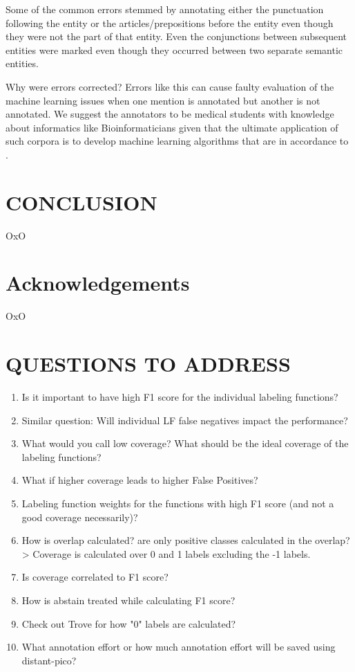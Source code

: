 \documentclass[10.7pt,]{article}
\begin{document}
Some of the common errors stemmed by annotating either the punctuation following the entity or the articles/prepositions before the entity even though they were not the part of that entity.
Even the conjunctions between subsequent entities were marked even though they occurred between two separate semantic entities.


Why were errors corrected?
Errors like this can cause faulty evaluation of the machine learning issues when one mention is annotated but another is not annotated.
We suggest the annotators to be medical students with knowledge about informatics like Bioinformaticians given that the ultimate application of such corpora is to develop machine learning algorithms that are in accordance to .
%
%
%
\section{CONCLUSION}\label{conclusion}
%
OxO
%
%
%
\section{Acknowledgements}\label{acknowledgements}
%
OxO
%
%
%
\section{QUESTIONS TO ADDRESS}\label{ques}
%

\begin{enumerate}
    \item Is it important to have high F1 score for the individual labeling functions?
    \item Similar question: Will individual LF false negatives impact the performance?
    \item What would you call low coverage? What should be the ideal coverage of the labeling functions?
    \item What if higher coverage leads to higher False Positives?
    \item Labeling function weights for the functions with high F1 score (and not a good coverage necessarily)?
    \item How is overlap calculated? are only positive classes calculated in the overlap? > Coverage is calculated over 0 and 1 labels excluding the -1 labels.
    \item Is coverage correlated to F1 score?
    \item How is abstain treated while calculating F1 score?
    \item Check out Trove for how "0" labels are calculated?
    \item What annotation effort or how much annotation effort will be saved using distant-pico?
\end{enumerate}
\end{document}
